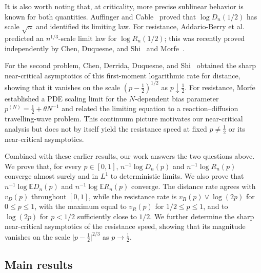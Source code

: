 \documentclass[12pt,preprint]{amsart}
\numberwithin{equation}{section}
\theoremstyle{plain}
\theoremstyle{definition}
\newcommand{\E}{\mathbb E}
\begin{document}
It is also worth noting that, at criticality, more precise sublinear behavior
is known for both quantities.  Auffinger and
Cable~\cite[Theorem~1]{AuffingerCable2017} proved that
$\log D_n(1/2)$ has scale $\sqrt n$ and identified its limiting law.  For
resistance, Addario-Berry et al.~\cite{AddarioBerryEtAl2020} predicted an
$n^{1/3}$-scale limit law for $\log R_n(1/2)$; this was recently proved
independently by Chen, Duquesne, and Shi~\cite{ChenDuquesneShi2026} and
Morfe~\cite{Morfe2026}.

For the second problem, Chen, Derrida, Duquesne, and
Shi~\cite[Theorem~1]{ChenDerridaDuquesneShi2026} obtained the sharp
near-critical asymptotics of this first-moment logarithmic rate for distance,
showing that it vanishes on the scale $(p-\frac12)^{1/2}$ as
$p\downarrow\frac12$. For resistance, Morfe~\cite[Theorem~2 and Section~1.5]{Morfe2026} established a PDE scaling limit for the \(N\)-dependent bias parameter \(p^{(N)}=\frac12+\theta N^{-1}\) and related the limiting equation to a reaction--diffusion travelling-wave problem. This continuum picture motivates our near-critical analysis but does not by itself yield the resistance speed at fixed \(p\ne\frac12\) or its near-critical asymptotics.

Combined with these earlier results, our work answers the two
questions above.  We prove that, for every $p\in[0,1]$,
$n^{-1}\log D_n(p)$ and $n^{-1}\log R_n(p)$ converge almost surely and in
$L^1$ to deterministic limits.  We also prove that
$n^{-1}\log\E D_n(p)$ and $n^{-1}\log\E R_n(p)$ converge.  The distance rate
agrees with $v_D(p)$ throughout $[0,1]$, while the resistance rate is
$v_R(p)\vee\log(2p)$ for $0\le p\le1$, with the maximum equal to $v_R(p)$
for $1/2\le p\le1$, and to $\log(2p)$ for $p<1/2$ sufficiently close to
$1/2$.  We further determine the sharp near-critical asymptotics of the
resistance speed, showing that its magnitude vanishes on the scale
$\lvert p-\frac12\rvert^{2/3}$ as $p\to\frac12$.

\subsection{Main results}
\label{sec:main-results}
\end{document}
